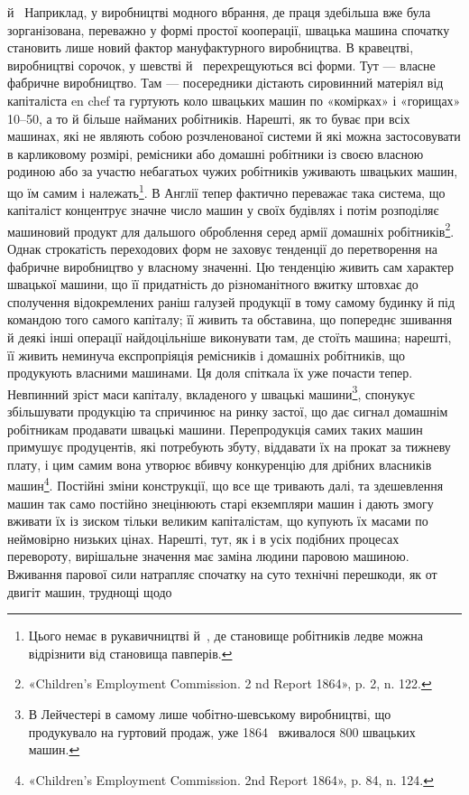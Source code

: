 \parcont{}  %
й~ Наприклад, у виробництві модного вбрання, де праця
здебільша вже була зорганізована, переважно у формі простої
кооперації, швацька машина спочатку становить лише новий
фактор мануфактурного виробництва. В кравецтві, виробництві
сорочок, у шевстві й~ перехрещуються всі форми. Тут —
власне фабричне виробництво. Там — посередники дістають сировинний
матеріял від капіталіста en chef та гуртують коло швацьких
машин по «комірках» і «горищах» 10--50, а то й більше найманих
робітників. Нарешті, як то буває при всіх машинах, які не
являють собою розчленованої системи й які можна застосовувати
в карликовому розмірі, ремісники або домашні робітники із
своєю власною родиною або за участю небагатьох чужих робітників
уживають швацьких машин, що їм самим і належать\footnote{
Цього немає в рукавичництві й~, де становище робітників
ледве можна відрізнити від становища павперів.
}.
В Англії тепер фактично переважає така система, що капіталіст
концентрує значне число машин у своїх будівлях і потім розподіляє
машиновий продукт для дальшого оброблення серед армії
домашніх робітників\footnote{
«Children’s Employment Commission. 2 nd Report 1864», p. 2,
n. 122.
}. Однак строкатість переходових форм
не заховує тенденції до перетворення на фабричне виробництво
у власному значенні. Цю тенденцію живить сам характер швацької
машини, що її придатність до різноманітного вжитку штовхає
до сполучення відокремлених раніш галузей продукції в
тому самому будинку й під командою того самого капіталу; її
живить та обставина, що попереднє зшивання й деякі інші операції
найдоцільніше виконувати там, де стоїть машина; нарешті,
її живить неминуча експропріяція ремісників і домашніх робітників,
що продукують власними машинами. Ця доля спіткала
їх уже почасти тепер. Невпинний зріст маси капіталу, вкладеного
у швацькі машини\footnote{
В Лейчестері в самому лише чобітно-шевському виробництві,
що продукувало на гуртовий продаж, уже 1864~ вживалося 800 швацьких
машин.
}, спонукує збільшувати продукцію та спричинює
на ринку застої, що дає сигнал домашнім робітникам продавати
швацькі машини. Перепродукція самих таких машин примушує
продуцентів, які потребують збуту, віддавати їх на прокат
за тижневу плату, і цим самим вона утворює вбивчу конкуренцію
для дрібних власників машин\footnote{
«Children’s Employment Commission. 2nd Report 1864», p. 84,
n. 124.
}. Постійні зміни конструкції,
що все ще тривають далі, та здешевлення машин так само постійно
знецінюють старі екземпляри машин і дають змогу вживати їх
із зиском тільки великим капіталістам, що купують їх масами
по неймовірно низьких цінах. Нарешті, тут, як і в усіх подібних
процесах перевороту, вирішальне значення має заміна людини
паровою машиною. Вживання парової сили натрапляє спочатку
на суто технічні перешкоди, як от двигіт машин, труднощі щодо
\parbreak{}  %

